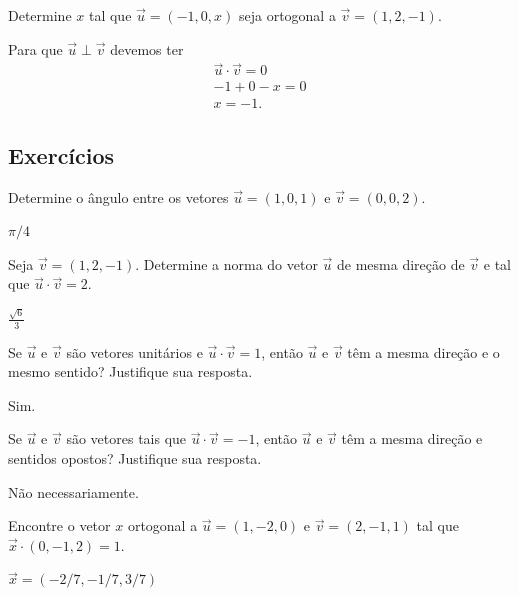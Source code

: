 \begin{exeresol}
  Determine $x$ tal que $\vec{u}=(-1,0,x)$ seja ortogonal a $\vec{v}=(1,2,-1)$.
\end{exeresol}
\begin{resol}
  Para que $\vec{u}\perp\vec{v}$ devemos ter
  \begin{gather}
    \vec{u}\cdot\vec{v} = 0 \\
    -1 + 0 -x = 0 \\
    x = -1.
  \end{gather}
\end{resol}

\subsection{Exercícios}

\begin{exer}
  Determine o ângulo entre os vetores $\vec{u}=(1,0,1)$ e $\vec{v}=(0,0,2)$.
\end{exer}
\begin{resp}
  $\pi/4$
\end{resp}

\begin{exer}
  Seja $\vec{v} = (1,2,-1)$. Determine a norma do vetor $\vec{u}$ de mesma direção de $\vec{v}$ e tal que $\vec{u}\cdot\vec{v}=2$.
\end{exer}
\begin{resp}
  $\frac{\sqrt{6}}{3}$
\end{resp}

\begin{exer}
  Se $\vec{u}$ e $\vec{v}$ são vetores unitários e $\vec{u}\cdot\vec{v}=1$, então $\vec{u}$ e $\vec{v}$ têm a mesma direção e o mesmo sentido? Justifique sua resposta.
\end{exer}
\begin{resp}
  Sim.
\end{resp}

\begin{exer}
  Se $\vec{u}$ e $\vec{v}$ são vetores tais que $\vec{u}\cdot\vec{v}=-1$, então $\vec{u}$ e $\vec{v}$ têm a mesma direção e sentidos opostos? Justifique sua resposta.
\end{exer}
\begin{resp}
  Não necessariamente.
\end{resp}

\begin{exer}
  Encontre o vetor $x$ ortogonal a $\vec{u}=(1,-2,0)$ e $\vec{v}=(2,-1,1)$ tal que $\vec{x}\cdot(0,-1,2)=1$.
\end{exer}
\begin{resp}
  $\vec{x}=(-2/7,-1/7,3/7)$
\end{resp}

